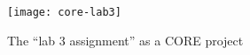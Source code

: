 \begin{figure}
  \centering
  \texttt{[image: core-lab3]}
  \caption{The ``lab 3 assignment'' as a CORE project}
  \label{fig:core-lab3}
\end{figure}
